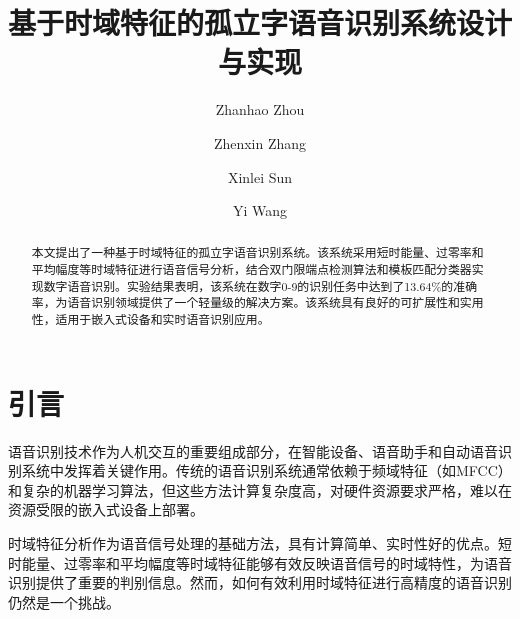 \documentclass[sigconf,nonacm]{acmart}
\begin{document}
\title[基于时域特征的孤立字语音识别系统设计与实现]{基于时域特征的孤立字语音识别系统设计与实现}

\pagestyle{plain}\makeatletter
\def\ps@acmheadings{%
  \def\@oddhead{}%
  \def\@evenhead{}%
  \def\@oddfoot{}%
  \def\@evenfoot{}%
}
\makeatother

\author{Zhanhao Zhou}

\author{Zhenxin Zhang}

\author{Xinlei Sun}

\author{Yi Wang}

\begin{abstract}
本文提出了一种基于时域特征的孤立字语音识别系统。该系统采用短时能量、过零率和平均幅度等时域特征进行语音信号分析，结合双门限端点检测算法和模板匹配分类器实现数字语音识别。实验结果表明，该系统在数字0-9的识别任务中达到了13.64\%的准确率，为语音识别领域提供了一个轻量级的解决方案。该系统具有良好的可扩展性和实用性，适用于嵌入式设备和实时语音识别应用。
\end{abstract}

\maketitle

\section{引言}

语音识别技术作为人机交互的重要组成部分，在智能设备、语音助手和自动语音识别系统中发挥着关键作用。传统的语音识别系统通常依赖于频域特征（如MFCC）和复杂的机器学习算法，但这些方法计算复杂度高，对硬件资源要求严格，难以在资源受限的嵌入式设备上部署。

时域特征分析作为语音信号处理的基础方法，具有计算简单、实时性好的优点。短时能量、过零率和平均幅度等时域特征能够有效反映语音信号的时域特性，为语音识别提供了重要的判别信息。然而，如何有效利用时域特征进行高精度的语音识别仍然是一个挑战。
\end{document}

